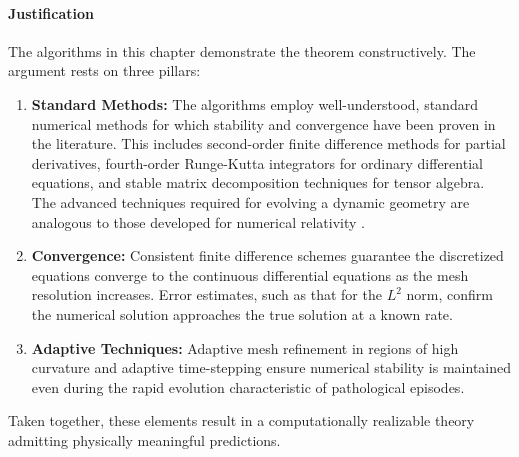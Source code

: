 \paragraph{Justification}
The algorithms in this chapter demonstrate the theorem constructively. The argument rests on three pillars:
\begin{enumerate}
    \item \textbf{Standard Methods:} The algorithms employ well-understood, standard numerical methods for which stability and convergence have been proven in the literature. This includes second-order finite difference methods for partial derivatives, fourth-order Runge-Kutta integrators for ordinary differential equations, and stable matrix decomposition techniques for tensor algebra. The advanced techniques required for evolving a dynamic geometry are analogous to those developed for numerical relativity \autocite{BaumgarteShapiro2010}.
    \item \textbf{Convergence:} Consistent finite difference schemes guarantee the discretized equations converge to the continuous differential equations as the mesh resolution increases. Error estimates, such as that for the \(L^2\) norm, confirm the numerical solution approaches the true solution at a known rate.
    \item \textbf{Adaptive Techniques:} Adaptive mesh refinement in regions of high curvature and adaptive time-stepping ensure numerical stability is maintained even during the rapid evolution characteristic of pathological episodes.
\end{enumerate}
Taken together, these elements result in a computationally realizable theory admitting physically meaningful predictions. 